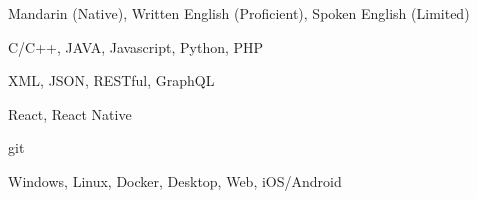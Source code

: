 
\begin{cvtbl}
        {Mandarin (Native), Written English (Proficient), Spoken English (Limited)}

        {C/C++, JAVA, Javascript, Python, PHP}

        {XML, JSON, RESTful, GraphQL}

        {React, React Native}

        {git}

        {Windows, Linux, Docker, Desktop, Web, iOS/Android}
\end{cvtbl}

\endinput